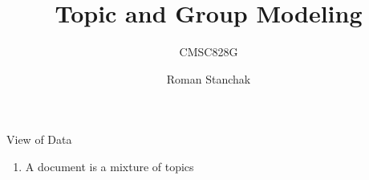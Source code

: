 \documentclass[%
pdf,
colorBG,
slideColor,
noFooter,
mm
]{prosper}
\begin{document}
\title{Topic and Group Modeling}
\subtitle{CMSC828G}
\author{Roman Stanchak}
\maketitle
\begin{slide}{View of Data}
	\begin{enumerate}
		\item A document is a mixture of topics
	\end{enumerate}
\end{slide}
\end{document}
